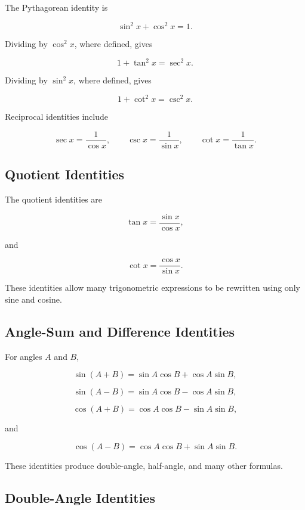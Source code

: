 The Pythagorean identity is

\[ \sin^2x+\cos^2x=1. \]

Dividing by \(\cos^2x\), where defined, gives

\[ 1+\tan^2x=\sec^2x. \]

Dividing by \(\sin^2x\), where defined, gives

\[ 1+\cot^2x=\csc^2x. \]

Reciprocal identities include

\[ \sec x=\frac1{\cos x},\qquad
\csc x=\frac1{\sin x},\qquad
\cot x=\frac1{\tan x}. \]

\subsection{Quotient Identities}
\label{subsec:quotient-identities}

The quotient identities are

\[ \tan x=\frac{\sin x}{\cos x}, \]

and

\[ \cot x=\frac{\cos x}{\sin x}. \]

These identities allow many trigonometric expressions to be rewritten using
only sine and cosine.

\subsection{Angle-Sum and Difference Identities}
\label{subsec:angle-sum-identities}

For angles \(A\) and \(B\),

\[ \sin(A+B)=\sin A\cos B+\cos A\sin B, \]

\[ \sin(A-B)=\sin A\cos B-\cos A\sin B, \]

\[ \cos(A+B)=\cos A\cos B-\sin A\sin B, \]

and

\[ \cos(A-B)=\cos A\cos B+\sin A\sin B. \]

These identities produce double-angle, half-angle, and many other formulas.

\subsection{Double-Angle Identities}
\label{subsec:double-angle-identities}

